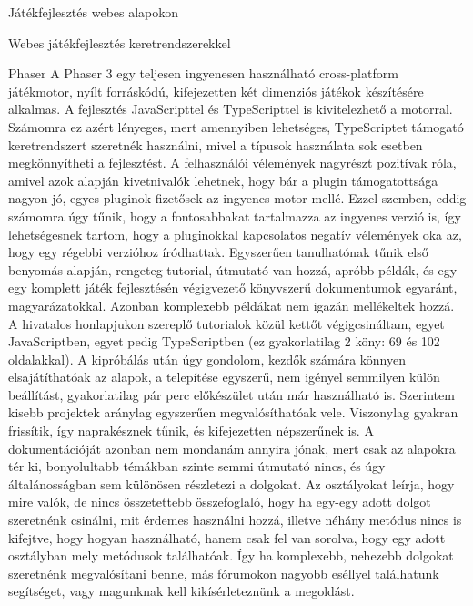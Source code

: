 \begin{MyChapter}{Játékfejlesztés webes alapokon}
\begin{MySection}{Webes játékfejlesztés keretrendszerekkel}
		\begin{MySubSection}{Phaser}
			A Phaser 3 egy teljesen ingyenesen használható cross-platform játékmotor, nyílt forráskódú, kifejezetten két dimenziós játékok készítésére alkalmas. A fejlesztés JavaScripttel és TypeScripttel is kivitelezhető a motorral. Számomra ez azért lényeges, mert amennyiben lehetséges, TypeScriptet támogató keretrendszert szeretnék használni, mivel a típusok használata sok esetben megkönnyítheti a fejlesztést.
			A felhasználói vélemények nagyrészt pozitívak róla, amivel azok alapján kivetnivalók lehetnek, hogy bár a plugin támogatottsága nagyon jó, egyes pluginok fizetősek az ingyenes motor mellé. Ezzel szemben, eddig számomra úgy tűnik, hogy a fontosabbakat tartalmazza az ingyenes verzió is, így lehetségesnek tartom, hogy a pluginokkal kapcsolatos negatív vélemények oka az, hogy egy régebbi verzióhoz íródhattak.
			Egyszerűen tanulhatónak tűnik első benyomás alapján, rengeteg tutorial, útmutató van hozzá, apróbb példák, és egy-egy komplett játék fejlesztésén végigvezető könyvszerű dokumentumok egyaránt, magyarázatokkal. Azonban komplexebb példákat nem igazán mellékeltek hozzá.
			A hivatalos honlapjukon szereplő tutorialok közül kettőt végigcsináltam, egyet JavaScriptben, egyet pedig TypeScriptben (ez gyakorlatilag 2 köny: 69 és 102 oldalakkal). 
			A kipróbálás után úgy gondolom, kezdők számára könnyen elsajátíthatóak az alapok, a telepítése egyszerű, nem igényel semmilyen külön beállítást, gyakorlatilag pár perc előkészület után már használható is.
			Szerintem kisebb projektek aránylag egyszerűen megvalósíthatóak vele.
			Viszonylag gyakran frissítik, így naprakésznek tűnik, és kifejezetten népszerűnek is.
			A dokumentációját azonban nem mondanám annyira jónak, mert csak az alapokra tér ki, bonyolultabb témákban szinte semmi útmutató nincs, és úgy általánosságban sem különösen részletezi a dolgokat. Az osztályokat leírja, hogy mire valók, de nincs összetettebb összefoglaló, hogy ha egy-egy adott dolgot szeretnénk csinálni, mit érdemes használni hozzá, illetve néhány metódus nincs is kifejtve, hogy hogyan használható, hanem csak fel van sorolva, hogy egy adott osztályban mely metódusok találhatóak. Így ha komplexebb, nehezebb dolgokat szeretnénk megvalósítani benne, más fórumokon nagyobb eséllyel találhatunk segítséget, vagy magunknak kell kikísérleteznünk a megoldást.
			

\end{MySubSection}
\end{MySection}
\end{MyChapter}
